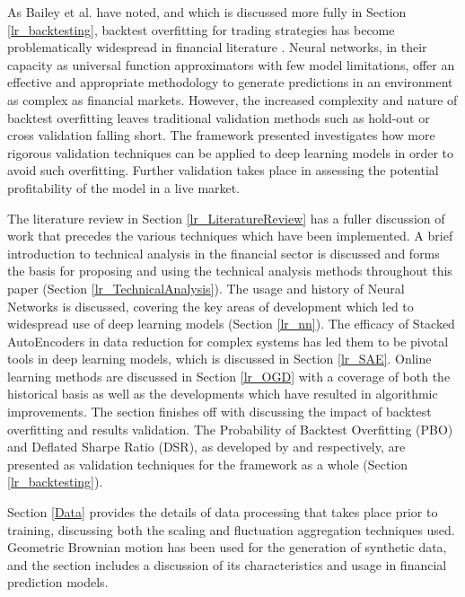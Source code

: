 \documentclass[a4paper,11pt,oneside]{article}
\theoremstyle{plain}
\theoremstyle{definition}
\begin{document}
	As Bailey et al. have noted, and which is discussed more fully in Section \ref{lr_backtesting}, backtest overfitting for trading strategies has become problematically widespread in financial literature \citep{BailyPBO}. Neural networks, in their capacity as universal function approximators with few model limitations, offer an effective and appropriate methodology to generate predictions in an environment as complex as financial markets. However, the increased complexity and nature of backtest overfitting leaves traditional validation methods such as hold-out or cross validation falling short. The framework presented investigates how more rigorous validation techniques can be applied to deep learning models in order to avoid such overfitting. Further validation takes place in assessing the potential profitability of the model in a live market.\newline

	The literature review in Section \ref{lr_LiteratureReview} has a fuller discussion of work that precedes the various techniques which have been implemented. A brief introduction to technical analysis in the financial sector is discussed and forms the basis for proposing and using the technical analysis methods throughout this paper (Section \ref{lr_TechnicalAnalysis}). The usage and history of Neural Networks is discussed, covering the key areas of development which led to widespread use of deep learning models (Section \ref{lr_nn}). The efficacy of Stacked AutoEncoders in data reduction for complex systems has led them to be pivotal tools in deep learning models, which is discussed in Section \ref{lr_SAE}. Online learning methods are discussed in Section \ref{lr_OGD} with a coverage of both the historical basis as well as the developments which have resulted in algorithmic improvements. The section finishes off with discussing the impact of backtest overfitting and results validation. The Probability of Backtest Overfitting (PBO) and Deflated Sharpe Ratio (DSR), as developed by \citet{BailyPBO} and \citet{PradoDSR} respectively, are presented as validation techniques for the framework as a whole (Section \ref{lr_backtesting}).\newline

	Section \ref{Data} provides the details of data processing that takes place prior to training, discussing both the scaling and fluctuation aggregation techniques used. Geometric Brownian motion has been used for the generation of synthetic data, and the section includes a discussion of its characteristics and usage in financial prediction models.\newline
\end{document}
